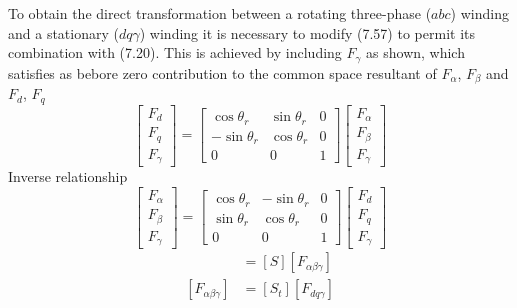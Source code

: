 \documentclass[a4paper,numbers=noenddot,12pt]{scrbook}
\begin{document}
        To obtain the direct transformation between  a rotating three-phase ($abc$) winding and a stationary ($dq\gamma$) winding it is necessary to modify (7.57) to permit its combination with (7.20). This is achieved by including $F_{\gamma}$ as shown, which satisfies as bebore zero contribution to the common space resultant of $F_{\alpha}$, $F_{\beta}$ and $F_d$, $F_q$
        \begin{equation}
            \begin{bmatrix}
                F_d \\ F_q \\ F_{\gamma}
            \end{bmatrix}
            =
            \begin{bmatrix}
                \cos \theta_r & \sin \theta_r & 0 \\
                -\sin \theta_r & \cos \theta_r & 0 \\
                0 & 0 &1
            \end{bmatrix}
            \begin{bmatrix}
                F_{\alpha} \\ F_{\beta} \\ F_{\gamma}
            \end{bmatrix}
            \label{eq:Eq7.58}
        \end{equation}
        Inverse relationship
        \begin{equation}
            \begin{bmatrix}
                F_{\alpha} \\ F_{\beta} \\ F_{\gamma}
            \end{bmatrix}
            =
            \begin{bmatrix}
                \cos \theta_r & -\sin \theta_r & 0 \\
                \sin \theta_r & \cos \theta_r & 0 \\
                0 & 0 &1
            \end{bmatrix}
            \begin{bmatrix}
                F_d \\ F_q \\ F_{\gamma}
            \end{bmatrix}
            \label{eq:Eq7.59}
        \end{equation}
        \begin{align}
            [F_{d q \gamma}] & = [S] [F_{\alpha \beta \gamma}] \\
            [F_{\alpha \beta \gamma}] & = [S_t] [F_{d q \gamma}] 
            \label{eq:Eq7.61}
        \end{align}
\end{document}
